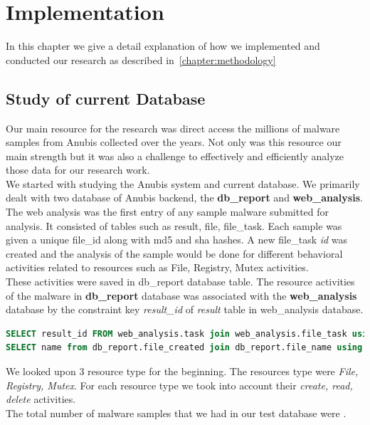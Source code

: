 \chapter{Implementation}\label{chapter:implementation}
In this chapter we give a detail explanation of how we implemented and conducted our research as described in~\autoref{chapter:methodology}
\section{Study of current Database}
Our main resource for the research was direct access the millions of malware samples from Anubis collected over the years.
Not only was this resource our main strength but it was also a challenge to effectively and efficiently analyze those data for our research work.\\
We started with studying the Anubis system and current database. We primarily dealt with two database of Anubis backend, the \textbf{db\_report} and \textbf{web\_analysis}.
The web analysis was the first entry of any sample malware submitted for analysis. It consisted of tables such as result, file, file\_task. Each sample was given a unique file\_id along with md5 and sha hashes.
A new file\_task \emph{id} was created  and the analysis of the sample would be done for different behavioral activities related to resources such as File, Registry, Mutex activities.\\
These activities were saved in db\_report database table.
The resource activities of the malware in \textbf{db\_report} database was associated with the \textbf{web\_analysis} database by the constraint key \textit{result\_id} of \emph{result} table in web\_analysis database.
\begin{lstlisting}[language=sql,caption={sql showing database structure to get file created activities of a malware},label={lst:resultidsql}]
SELECT result_id FROM web_analysis.task join web_analysis.file_task using (task_id) join web_analysis.file using (file_id) WHERE task_id=result_id;
SELECT name from db_report.file_created join db_report.file_name using (file_name_id) where result_id ='12345';
\end{lstlisting}
We looked upon 3 resource type for the beginning. The resources type were \textit{File, Registry, Mutex}. For each resource type we took into account their \textit{create, read, delete} activities.\\
The total number of malware samples that we had in our test database were \textbf{\gettotalmalwarei{}}.\\
